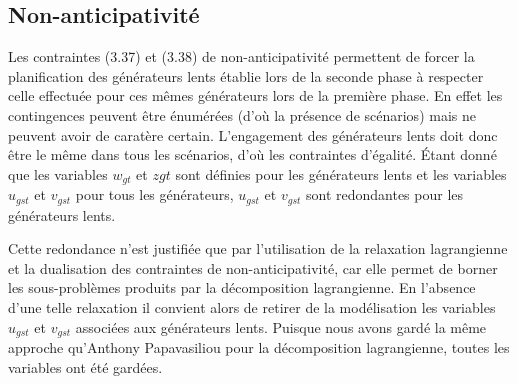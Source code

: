 \subsection{Non-anticipativité}

Les contraintes (3.37) et (3.38) de non-anticipativité permettent de forcer la planification des générateurs lents établie lors de la seconde phase
à respecter celle effectuée pour ces mêmes générateurs lors de la première phase. En effet les contingences peuvent être énumérées (d'où la présence
de scénarios) mais ne peuvent avoir de caratère certain. L'engagement des générateurs lents doit donc être le même dans tous les scénarios,
d'où les contraintes d'égalité. Étant donné que les variables $w_{gt}$ et $z{gt}$ sont définies pour les générateurs lents
et les variables $u_{gst}$ et $v_{gst}$ pour tous les générateurs, $u_{gst}$ et $v_{gst}$ sont redondantes pour les générateurs lents.

Cette redondance n'est justifiée que par l'utilisation de la relaxation lagrangienne et la dualisation des contraintes de non-anticipativité, car
elle permet de borner les sous-problèmes produits par la décomposition lagrangienne. En l'absence d'une telle relaxation il convient alors de retirer 
de la modélisation les variables $u_{gst}$ et $v_{gst}$ associées aux générateurs lents. Puisque nous avons gardé la même approche qu'Anthony Papavasiliou
pour la décomposition lagrangienne, toutes les variables ont été gardées.